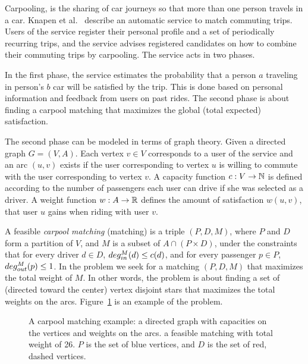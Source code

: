 Carpooling, is the sharing of car journeys so that more than one person travels
in a car.
Knapen et al.~\cite{knapen2013estimating} describe an automatic service
to match commuting trips.
Users of the service register their personal profile and a set of periodically
recurring trips, 
and the service advises registered candidates on how to combine their commuting
trips by carpooling.
The service acts in two phases. 

In the first phase, the service estimates the probability that a person $a$
traveling in person's $b$ car will be satisfied by the trip.
This is done based on personal information and feedback from users on past
rides.
The second phase is about finding a carpool matching
that maximizes the global (total expected) satisfaction.

The second phase can be modeled in terms of graph theory.
Given a directed graph $G = (V, A)$.
Each vertex $v \in V$ corresponds to a user of the service and an arc
$(u, v)$ exists if the user corresponding to vertex $u$ is willing to
commute with the user corresponding to vertex $v$.
A capacity function $ c: V \rightarrow \mathbb{N} $ is defined
according to the number of passengers each user can drive if she was
selected as a driver.
A weight function $w : A \rightarrow \mathbb{R} $ defines the amount of
satisfaction $w(u, v)$,
that user $u$ gains when riding with user $v$.

A feasible \emph{carpool matching} (matching) is a triple 
$(P, D, M)$, where $P$ and $D$ form a partition of $V$, 
and $M$ is a subset of $A \cap (P \times D)$,
under the constraints that for every driver $d \in D$, 
$deg^M_{in}(d) \leq c(d)$, 
and for every passenger $p \in P$, ${deg^M_{out}(p) \leq 1}$.
In the \textsc{\CARPOOL{}} problem we seek for a matching $(P, D, M)$ that maximizes the
total weight of $M$.
In other words, the \textsc{\CARPOOL{}} problem is about finding a set of 
(directed toward the center) vertex disjoint stars 
that maximizes the total weights on the arcs.
Figure~\ref{fig:carpool} is an example of the \textsc{\CARPOOL{}} problem.

\begin{figure}
\centering

\caption[]{
\label{fig:carpool}
A carpool matching example: 
a directed graph with capacities on the vertices and weights on the arcs. 
a feasible matching with total weight of 26.
$P$ is the set of blue vertices, and $D$ is the set of red, dashed vertices. 
}
\end{figure}  

